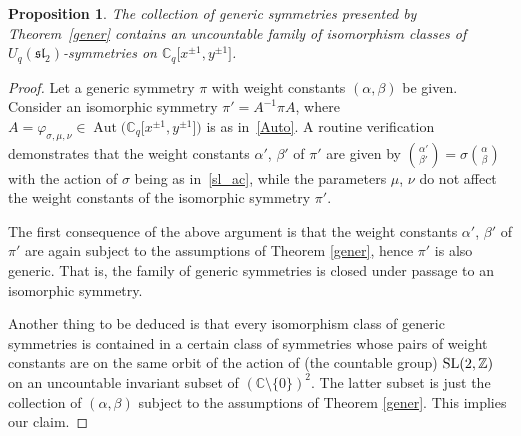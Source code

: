 \documentclass[pdftex]{sigma}
\numberwithin{equation}{section}
\newtheorem{Proposition}[Theorem]{Proposition}
 { \theoremstyle{definition}
\newtheorem{Definition}[Theorem]{Definition}
\newtheorem{Remark}[Theorem]{Remark} }
\begin{document}
\begin{Proposition}\label{ufnis} The collection of generic symmetries presented by Theorem~{\rm \ref{gener}} contains an uncountable family of isomorphism classes of $U_q(\mathfrak{sl}_2)$-symmetries on $\mathbb{C}_q\big[x^{\pm 1},y^{\pm 1}\big]$.
\end{Proposition}

\begin{proof} Let a generic symmetry $\pi$ with weight constants $(\alpha,\beta)$ be given. Consider an isomorphic symmetry $\pi'=A^{-1}\pi A$, where $A=\varphi_{\sigma,\mu,\nu}\in\operatorname{Aut}\big(\mathbb{C}_q\big[x^{\pm 1},y^{\pm 1}\big]\big)$ is as in~\eqref{Auto}. A routine verification demonstrates that the weight constants $\alpha'$, $\beta'$ of $\pi'$ are given by $\binom{\alpha'}{\beta'}=\sigma\binom{\alpha}{\beta}$ with the action of $\sigma$ being as in~\eqref{sl_ac}, while the parameters $\mu$, $\nu$ do not affect the weight constants of the isomorphic symmetry $\pi'$.

The first consequence of the above argument is that the weight constants $\alpha'$, $\beta'$ of $\pi'$ are again subject to the assumptions of Theorem \ref{gener}, hence $\pi'$ is also generic. That is, the family of generic symmetries is closed under passage to an isomorphic symmetry.

Another thing to be deduced is that every isomorphism class of generic symmetries is contained in a certain class of symmetries whose pairs of weight constants are on the same orbit of the action of (the countable group) ${\rm SL}(2,\mathbb{Z})$ on an uncountable invariant subset of $(\mathbb{C}{\setminus}\{0\})^2$. The latter subset is just the collection of $(\alpha,\beta)$ subject to the assumptions of Theorem \ref{gener}. This implies our claim.
\end{proof}
\end{document}
